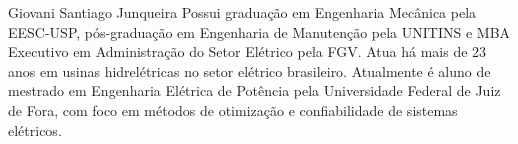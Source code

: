 \documentclass[journal]{IEEEtran}
\begin{document}
\begin{IEEEbiography}{Giovani Santiago Junqueira}
Possui graduação em Engenharia Mecânica pela EESC-USP, pós-graduação em Engenharia de Manutenção pela UNITINS e MBA Executivo em Administração do Setor Elétrico pela FGV. Atua há mais de 23 anos em usinas hidrelétricas no setor elétrico brasileiro. Atualmente é aluno de mestrado em Engenharia Elétrica de Potência pela Universidade Federal de Juiz de Fora, com foco em métodos de otimização e confiabilidade de sistemas elétricos.
\end{IEEEbiography}




\vfill
\end{document}
